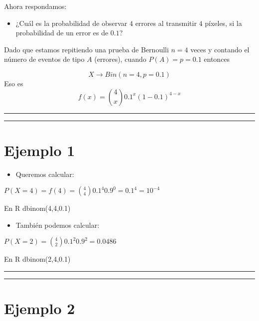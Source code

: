 \documentclass[
]{book}
\providecommand{\tightlist}{%
  \setlength{\itemsep}{0pt}\setlength{\parskip}{0pt}}
\begin{document}
Ahora respondamos:

\begin{itemize}
\tightlist
\item
  ¿Cuál es la probabilidad de observar \(4\) errores al transmitir \(4\) píxeles, si la probabilidad de un error es de \(0.1\)?
\end{itemize}

Dado que estamos repitiendo una prueba de Bernoulli \(n=4\) veces y contando el número de eventos de tipo \(A\) (errores), cuando \(P(A)=p=0.1\) entonces

\[X \rightarrow Bin(n=4, p=0.1)\]
Eso es \[f(x)=\binom 4 x 0.1^x(1-0.1)^{4-x}\]

\begin{center}\rule{0.5\linewidth}{0.5pt}\end{center}

\begin{center}\rule{0.5\linewidth}{0.5pt}\end{center}

\hypertarget{ejemplo-1-2}{%
\section{Ejemplo 1}\label{ejemplo-1-2}}

\begin{itemize}
\tightlist
\item
  Queremos calcular:
\end{itemize}

\(P(X=4)=f(4)=\binom 4 4 0.1^4 0.9^{0}=0.1^4=10^{-4}\)

En R dbinom(4,4,0.1)

\begin{itemize}
\tightlist
\item
  También podemos calcular:
\end{itemize}

\(P(X=2)=\binom 4 2 0.1^2 0.9^2=0.0486\)

En R dbinom(2,4,0.1)

\begin{center}\rule{0.5\linewidth}{0.5pt}\end{center}

\begin{center}\rule{0.5\linewidth}{0.5pt}\end{center}

\hypertarget{ejemplo-2-1}{%
\section{Ejemplo 2}\label{ejemplo-2-1}}
\end{document}
